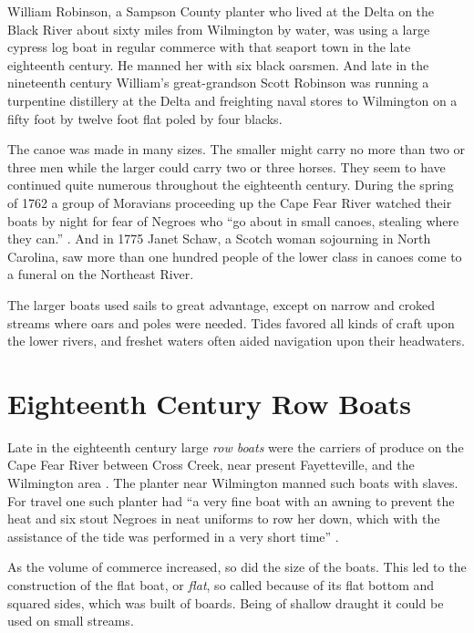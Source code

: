 \documentclass[11pt, a5paper, openright]{book}
\begin{document}
William Robinson, a Sampson County planter who lived at the Delta on
the Black River about sixty miles from Wilmington by water, was using
a large cypress log boat in regular commerce with that seaport town in
the late eighteenth century.  He manned her with six black oarsmen.
And late in the nineteenth century William's great-grandson Scott
Robinson was running a turpentine distillery at the Delta and
freighting naval stores to Wilmington on a fifty foot by twelve foot
flat poled by four blacks.  \citep{shawg}\par

The canoe was made in many sizes.  The smaller might carry no more
than two or three men while the larger could carry two or three
horses.  They seem to have continued quite numerous throughout the
eighteenth century.  During the spring of 1762 a group of Moravians
proceeding up the Cape Fear River watched their boats by night for
fear of Negroes who ``go about in small canoes, stealing where they
can.'' \citep[I,~261]{friesal}.  And in 1775 Janet Schaw, a Scotch
woman sojourning in North Carolina, saw more than one hundred people of
the lower class in canoes come to a funeral on the Northeast
River.\citep[171]{schawj}\par

The larger boats used sails to great advantage, except on narrow and
croked streams where oars and poles were needed.  Tides favored all
kinds of craft upon the lower rivers, and freshet waters often aided
navigation upon their headwaters.\par

\section{Eighteenth Century Row Boats}

Late in the eighteenth century large \textit{row boats} were the
carriers of produce on the Cape Fear River between Cross Creek, near
present Fayetteville, and the Wilmington area \citep[280-281]{schawj}.
The planter near Wilmington manned such boats with slaves.  For travel
one such planter had ``a very fine boat with an awning to prevent the
heat and six stout Negroes in neat uniforms to row her down, which with
the assistance of the tide was performed in a very short time''
\citep[177]{schawj}.\par

As the volume of commerce increased, so did the size of the boats.
This led to the construction of the flat boat, or \textit{flat}, so
called because of its flat bottom and squared sides, which was built
of boards.  Being of shallow draught it could be used on small
streams.\par
\end{document}
